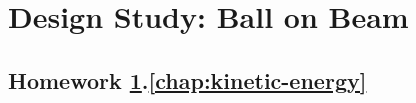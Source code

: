 
\chapter{Design Study: Ball on Beam}
\label{hw:ballbeam}




\vspace{.5cm}



\clearpage

	\section*{
		Homework \ref{hw:ballbeam}.\ref{chap:kinetic-energy}} \label{hw:ballbeam_kinetic}
		
%		
